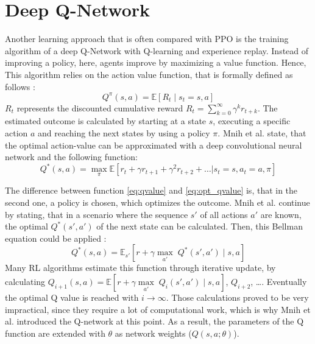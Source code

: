 \section{Deep Q-Network}\label{dqn}
Another learning approach that is often compared with PPO is the training algorithm of a deep Q-Network with Q-learning and experience replay. Instead of improving a policy, here, agents improve by maximizing a value function. Hence, This algorithm relies on the action value function, that is formally defined as follows \cite{mnba16}:
\begin{equation}\label{eq:qvalue}
    Q^\pi(s,a) = \mathbb{E} \left[ R_t \mid s_t = s,a \right]
\end{equation} 
$R_t$ represents the discounted cumulative reward $R_t=\sum^{\infty}_{k=0} \gamma^k r_{t+k}$. The estimated outcome is calculated by starting at a state $s$, executing a specific action $a$ and reaching the next states by using a policy $\pi$. Mnih et al. \cite{mnka15} state, that the optimal action-value can be approximated with a deep convolutional neural network and the following function:
\begin{equation}\label{eq:opt_qvalue}
    Q^*(s,a) =  \underset{\pi} \max \mathbb{E}\left[ r_{t} + \gamma r_{t+1} + \gamma^2 r_{t+2} + \ldots | s_t = s, a_t = a, \pi \right]
\end{equation}

The difference between function \eqref{eq:qvalue} and \eqref{eq:opt_qvalue} is, that in the second one, a policy is chosen, which optimizes the outcome. Mnih et al. continue by stating, that in a scenario where the sequence $s'$ of all actions $a'$ are known, the optimal $Q^*(s',a')$ of the next state can be calculated. Then, this Bellman equation could be applied \cite{mnba16}: 
\begin{equation}\label{eq:bel_qvalue}
    Q^*(s,a) =  \mathbb{E}_{s'} \left[ r+ \gamma \underset{a'}\max \; Q^* (s', a') \mid s,a \right]
\end{equation}
Many RL algorithms estimate this function through iterative update, by calculating $Q_{i+1}(s,a) =  \mathbb{E} \left[ r+ \gamma \underset{a'}\max \; Q_i (s', a') \mid s,a \right]$, $Q_{i+2}$, \dots \cite{mnka13}. Eventually the optimal Q value is reached with $i\rightarrow \infty$. Those calculations proved to be very impractical, since they require a lot of computational work, which is why Mnih et al. introduced the Q-network at this point. As a result, the parameters of the Q function are extended with $\theta$ as network weights ($Q(s,a;\theta)$).

